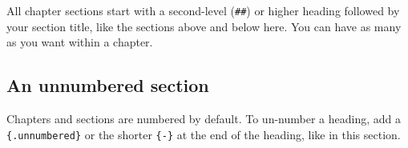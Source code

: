 \documentclass[
]{book}
\begin{document}
All chapter sections start with a second-level (\texttt{\#\#}) or higher heading followed by your section title, like the sections above and below here. You can have as many as you want within a chapter.

\hypertarget{an-unnumbered-section}{%
\subsection*{An unnumbered section}\label{an-unnumbered-section}}

Chapters and sections are numbered by default. To un-number a heading, add a \texttt{\{.unnumbered\}} or the shorter \texttt{\{-\}} at the end of the heading, like in this section.

  
\end{document}
